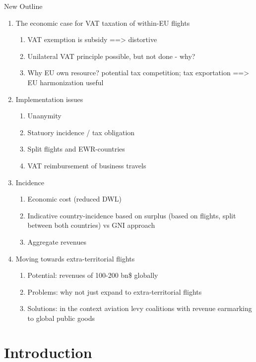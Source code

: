 

New Outline
\begin{enumerate}
    \item The economic case for VAT taxation of within-EU flights
    \begin{enumerate}
        \item VAT exemption is subsidy ==> distortive
        \item Unilateral VAT principle possible, but not done - why?
        \item Why EU own resource? potential tax competition; tax exportation ==> EU harmonization useful
    \end{enumerate}
    \item Implementation issues
    \begin{enumerate}
        \item Unanymity 
        \item Statuory incidence / tax obligation
        \item Split flights and EWR-countries
        \item VAT reimbursement of business travels
    \end{enumerate}
    \item Incidence
    \begin{enumerate}
        \item Economic cost (reduced DWL)
        \item Indicative country-incidence based on surplus (based on flights, split between both countries) vs GNI approach
        \item Aggregate revenues
    \end{enumerate}
    \item Moving towards extra-territorial flights
    \begin{enumerate}
    \item Potential: revenues of 100-200 bn\$ globally
        \item Problems: why not just expand to extra-territorial flights
        \item Solutions: in the context aviation levy coalitions with revenue earmarking to global public goods
    \end{enumerate}
\end{enumerate}

\section{Introduction}


